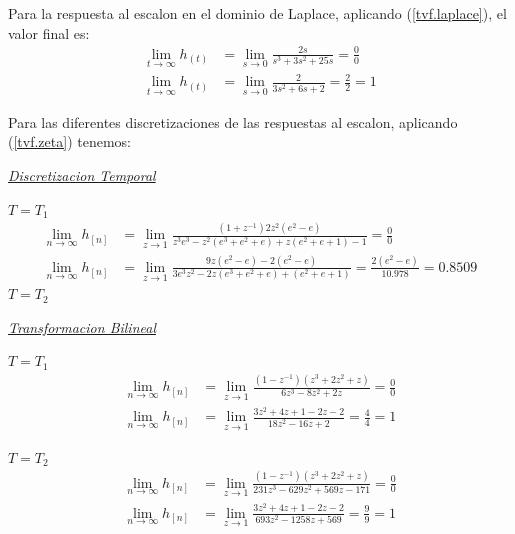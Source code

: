 \documentclass[a4paper,12pt]{report}
\begin{document}
\begin{enumerate}[label=\alph*), left=0pt]
                Para la respuesta al escalon en el dominio de Laplace, aplicando (\ref{tvf.laplace}), el valor final es:
                \begin{align*}
                    \lim_{t \to \infty} h_{(t)} &= \lim_{s \to 0} \frac{2s}{s^3 + 3s^2 + 25s} = \frac{0}{0}\\
                    \lim_{t \to \infty} h_{(t)} &= \lim_{s \to 0} \frac{2}{3s^2 + 6s + 2} = \frac{2}{2} = 1
                \end{align*}

                Para las diferentes discretizaciones de las respuestas al escalon, aplicando (\ref{tvf.zeta}) tenemos:

                {\centering\underline{\textit{Discretizacion Temporal}}\par}
                $T = T_1$
                \begin{align*}
                    \lim_{n \to \infty} h_{[n]} &= \lim_{z \to 1} \frac{(1 + z^{-1}) 2z^2 (e^2 - e)}{z^3 e^3 - z^2(e^3+e^2+e)+z(e^2+e+1)-1} = \frac{0}{0}\\
                    \lim_{n \to \infty} h_{[n]} &= \lim_{z \to 1} \frac{9z(e^2-e) - 2(e^2-e)}{3e^3z^2-2z(e^3+e^2+e)+(e^2+e+1)} = \frac{2(e^2-e)}{10.978} = 0.8509
                \end{align*}
                $T = T_2$

                {\centering\underline{\textit{Transformacion Bilineal}}\par}
                $T = T_1$
                \begin{align*}
                    \lim_{n \to \infty} h_{[n]} &= \lim_{z\to{1}} \frac{(1-z^{-1})(z^3+2z^2+z)}{6z^3-8z^2+2z} = \frac{0}{0}\\
                    \lim_{n \to \infty} h_{[n]} &= \lim_{z\to{1}} \frac{3z^2+4z+1-2z-2}{18z^2-16z+2} = \frac{4}{4} = 1
                \end{align*}

                $T = T_2$
                \begin{align*}
                    \lim_{n \to \infty} h_{[n]} &= \lim_{z \to 1} \frac{(1-z^{-1})(z^3+2z^2+z)}{231z^3-629z^2+569z-171} = \frac{0}{0}\\
                    \lim_{n \to \infty} h_{[n]} &= \lim_{z \to 1} \frac{3z^2+4z+1-2z-2}{693z^2-1258z+569} = \frac{9}{9} = 1
                \end{align*}


\end{enumerate}
\end{document}
